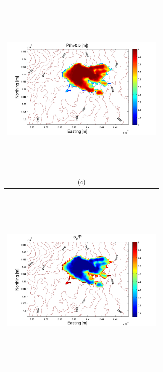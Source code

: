 \documentclass[12pt]{article}
\newcommand{\Pic}[2][0.85]{\begin{center}\texttt{[image: \#2]}
 \end{center} }
\begin{document}
\begin{figure}[H]
\begin{minipage}{0.6\textwidth}
\begin{tabular}{c}
        \end{tabular}
    \end{minipage} 
        \begin{minipage}[b]{0.6\textwidth}
        \begin{tabular}{c}
       \includegraphics[width=8cm,height=9cm,keepaspectratio]{figs_pdf/Galeras_3_P.pdf}\\
        (c)
        \end{tabular}
    \end{minipage}
    \begin{minipage}{0.6\textwidth}
        \begin{tabular}{c}
	\includegraphics[width=8cm,height=9cm,keepaspectratio]{figs_pdf/Galeras_3_sigma.pdf}\\

\end{tabular}
\end{minipage}
\end{figure}
\end{document}
